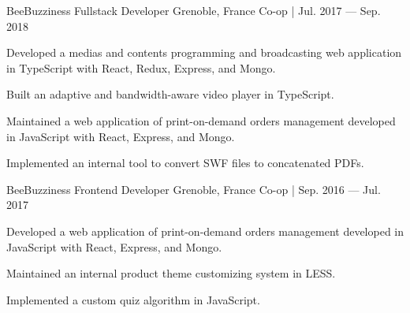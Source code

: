 \begin{cventries}
    \cventry
    {BeeBuzziness} %
    {Fullstack Developer} %
    {Grenoble, France} %
    {Co-op | Jul. 2017 — Sep. 2018} %
    {
    \begin{cvitems} %
        \item {Developed a medias and contents programming and broadcasting web application in TypeScript with React, Redux, Express, and Mongo.}
        \item {Built an adaptive and bandwidth-aware video player in TypeScript.}
        \item {Maintained a web application of print-on-demand orders management developed in JavaScript with React, Express, and Mongo.}
        \item {Implemented an internal tool to convert SWF files to concatenated PDFs.}
    \end{cvitems}
    }

    \cventry
    {BeeBuzziness} %
    {Frontend Developer} %
    {Grenoble, France} %
    {Co-op | Sep. 2016 — Jul. 2017} %
    {
    \begin{cvitems} %
        \item {Developed a web application of print-on-demand orders management developed in JavaScript with React, Express, and Mongo.}
        \item {Maintained an internal product theme customizing system in LESS.}
        \item {Implemented a custom quiz algorithm in JavaScript.}
    \end{cvitems}
    }

\end{cventries}
